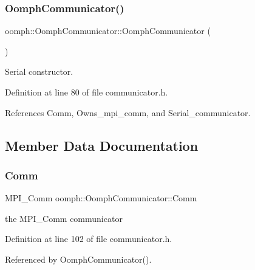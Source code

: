\subsubsection{\texorpdfstring{Oomph\+Communicator()}{OomphCommunicator()}\hspace{0.1cm}{\footnotesize\ttfamily [2/2]}}
{\footnotesize\ttfamily oomph\+::\+Oomph\+Communicator\+::\+Oomph\+Communicator (\begin{DoxyParamCaption}{ }\end{DoxyParamCaption})\hspace{0.3cm}{\ttfamily [inline]}}



Serial constructor. 



Definition at line 80 of file communicator.\+h.



References Comm, Owns\+\_\+mpi\+\_\+comm, and Serial\+\_\+communicator.



\subsection{Member Data Documentation}
\mbox{\label{classoomph_1_1OomphCommunicator_a334dbb45abab2e123872f487883f0b56}} 
\subsubsection{\texorpdfstring{Comm}{Comm}}
{\footnotesize\ttfamily M\+P\+I\+\_\+\+Comm oomph\+::\+Oomph\+Communicator\+::\+Comm\hspace{0.3cm}{\ttfamily [private]}}



the M\+P\+I\+\_\+\+Comm communicator 



Definition at line 102 of file communicator.\+h.



Referenced by Oomph\+Communicator().

\mbox{\label{classoomph_1_1OomphCommunicator_a8c80f30933f22b84f97fcbbee6b22e81}} 
